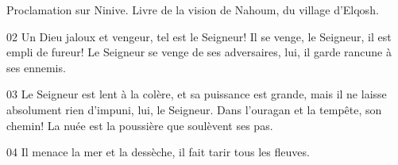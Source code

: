 Proclamation sur Ninive. Livre de la vision de Nahoum, du village d’Elqosh.

02 Un Dieu jaloux et vengeur, tel est le Seigneur! Il se venge, le Seigneur, il est empli de fureur! Le Seigneur se venge de ses adversaires, lui, il garde rancune à ses ennemis.

03 Le Seigneur est lent à la colère, et sa puissance est grande, mais il ne laisse absolument rien d’impuni, lui, le Seigneur. Dans l’ouragan et la tempête, son chemin! La nuée est la poussière que soulèvent ses pas.

04 Il menace la mer et la dessèche, il fait tarir tous les fleuves. 